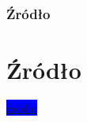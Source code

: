 \documentclass[serif]{beamer}
\begin{document}
\begin{frame}
\frametitle{Źródło}
\section{Źródło}
\colorbox{blue} {\href {https://pl.wikipedia.org/wiki/LaTeX} {źródło}}
\end{frame}
\end{document}
